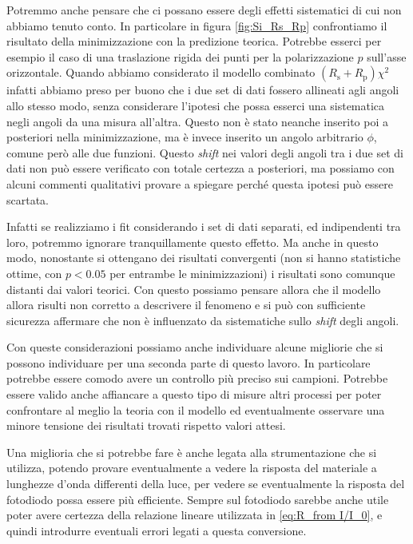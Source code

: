 \documentclass[
    prb,altaffilletter,citeautoscript,
    amsmath,amssymb,
    showpacs,showkeys,floatfix,
    reprint
]{revtex4-1}
\begin{document}
 Potremmo anche pensare che ci possano essere degli effetti sistematici di cui non abbiamo tenuto conto. In particolare in figura \ref{fig:Si_Rs_Rp} confrontiamo il risultato della minimizzazione con la predizione teorica. Potrebbe esserci per esempio il caso di una traslazione rigida dei punti per la polarizzazione $p$ sull'asse orizzontale. Quando abbiamo considerato il modello combinato $(R_\mathrm{s}+R_\mathrm{p})\chi^2$ infatti abbiamo preso per buono che i due set di dati fossero allineati agli angoli allo stesso modo, senza considerare l'ipotesi che possa esserci una sistematica negli angoli da una misura all'altra. Questo non è stato neanche inserito poi a posteriori nella minimizzazione, ma è invece inserito un angolo arbitrario $\phi$, comune però alle due funzioni. Questo \textit{shift} nei valori degli angoli tra i due set di dati non può essere verificato con totale certezza a posteriori, ma possiamo con alcuni commenti qualitativi provare a spiegare perché questa ipotesi può essere scartata. 

 Infatti se realizziamo i fit considerando i set di dati separati, ed indipendenti tra loro, potremmo ignorare tranquillamente questo effetto. Ma anche in questo modo, nonostante si ottengano dei risultati convergenti (non si hanno statistiche ottime, con $p<0.05$ per entrambe le minimizzazioni) i risultati sono comunque distanti dai valori teorici. Con questo possiamo pensare allora che il modello allora risulti non corretto a descrivere il fenomeno e si può con sufficiente sicurezza affermare che non è influenzato da sistematiche sullo \textit{shift} degli angoli. 

Con queste considerazioni possiamo anche individuare alcune migliorie che si possono individuare per una seconda parte di questo lavoro. In particolare potrebbe essere comodo avere un controllo più preciso sui campioni. Potrebbe essere valido anche affiancare a questo tipo di misure altri processi per poter confrontare al meglio la teoria con il modello ed eventualmente osservare una minore tensione dei risultati trovati rispetto valori attesi. 

Una miglioria che si potrebbe fare è anche legata alla strumentazione che si utilizza, potendo provare eventualmente a vedere la risposta del materiale a lunghezze d'onda differenti della luce, per vedere se eventualmente la risposta del fotodiodo possa essere più efficiente. Sempre sul fotodiodo sarebbe anche utile poter avere certezza della relazione lineare utilizzata in \eqref{eq:R_from I/I_0}, e quindi introdurre eventuali errori legati a questa conversione. 
\end{document}
